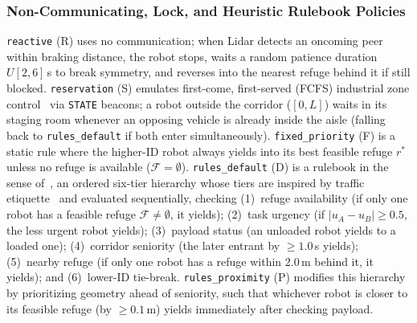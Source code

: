 \subsubsection{Non-Communicating, Lock, and Heuristic Rulebook Policies}
\texttt{reactive} (R) uses no communication; when Lidar detects an oncoming peer within braking distance, the robot stops, waits a random patience duration $U[2,6]$\,s to break symmetry, and reverses into the nearest refuge behind it if still blocked.
\texttt{reservation} (S) emulates first-come, first-served (FCFS) industrial zone control~\cite{fanti2002event} via \texttt{STATE} beacons; a robot outside the corridor ($[0,L]$) waits in its staging room whenever an opposing vehicle is already inside the aisle (falling back to \texttt{rules\_default} if both enter simultaneously).
\texttt{fixed\_priority} (F) is a static rule where the higher-ID robot always yields into its best feasible refuge $r^\ast$ unless no refuge is available ($\mathcal{F}=\emptyset$).
\texttt{rules\_default} (D) is a rulebook in the sense of~\cite{censi2019rulebooks}, an ordered six-tier hierarchy whose tiers are inspired by traffic etiquette~\cite{kato1992coordinating,highwaycode} and evaluated sequentially, checking 
(1)~refuge availability (if only one robot has a feasible refuge $\mathcal{F} \neq \emptyset$, it yields); 
(2)~task urgency (if $|u_A - u_B| \ge 0.5$, the less urgent robot yields); 
(3)~payload status (an unloaded robot yields to a loaded one); 
(4)~corridor seniority (the later entrant by $\ge 1.0$\,s yields); 
(5)~nearby refuge (if only one robot has a refuge within 2.0\,m behind it, it yields); and 
(6)~lower-ID tie-break. 
\texttt{rules\_proximity} (P) modifies this hierarchy by prioritizing geometry ahead of seniority, such that whichever robot is closer to its feasible refuge (by $\ge 0.1$\,m) yields immediately after checking payload.

